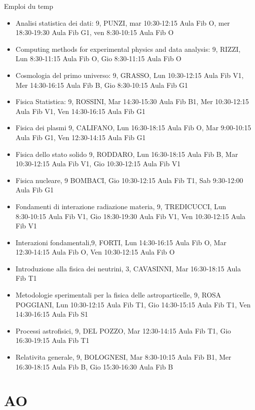 \documentclass[10pt,xcolor={usenames},fleqn,mathserif,serif]{beamer}
\begin{document}
\begin{frame}[allowframebreaks,label={lm2122I}]{Emploi du temp}
\begin{itemize}
\item Analisi statistica dei dati: 9, PUNZI, mar 10:30‑12:15 Aula Fib O, mer 18:30‑19:30 Aula Fib G1, ven 8:30‑10:15 Aula Fib O
\item Computing methods for experimental physics and data analysis: 9, RIZZI, Lun 8:30‑11:15 Aula Fib O, Gio 8:30‑11:15 Aula Fib O
\item Cosmologia del primo universo: 9, GRASSO, Lun 10:30‑12:15 Aula Fib V1, Mer 14:30‑16:15 Aula Fib B, Gio 8:30‑10:15 Aula Fib G1
\item Fisica Statistica: 9, ROSSINI, Mar 14:30‑15:30 Aula Fib B1, Mer 10:30‑12:15 Aula Fib V1, Ven 14:30‑16:15 Aula Fib G1
\item Fisica dei plasmi	9, CALIFANO, Lun 16:30‑18:15 Aula Fib O, Mar 9:00‑10:15 Aula Fib G1, Ven 12:30‑14:15 Aula Fib G1
\item Fisica dello stato solido	9, RODDARO, Lun 16:30‑18:15 Aula Fib B, Mar 10:30‑12:15 Aula Fib V1, Gio 10:30‑12:15 Aula Fib V1
\item Fisica nucleare, 9 BOMBACI, Gio 10:30‑12:15 Aula Fib T1, Sab 9:30‑12:00 Aula Fib G1
\item Fondamenti di interazione radiazione materia, 9, TREDICUCCI, Lun 8:30‑10:15 Aula Fib V1, Gio 18:30‑19:30 Aula Fib V1, Ven 10:30‑12:15 Aula Fib V1
\item Interazioni fondamentali,9, FORTI, Lun 14:30‑16:15 Aula Fib O, Mar 12:30‑14:15 Aula Fib O, Ven 10:30‑12:15 Aula Fib O
\item Introduzione alla fisica dei neutrini, 3, CAVASINNI, Mar 16:30‑18:15 Aula Fib T1
\item Metodologie sperimentali per la fisica delle astroparticelle, 9, ROSA POGGIANI, Lun 10:30‑12:15 Aula Fib T1, Gio 14:30‑15:15 Aula Fib T1, Ven 14:30‑16:15 Aula Fib S1
\item Processi astrofisici, 9, DEL POZZO, Mar 12:30‑14:15 Aula Fib T1, Gio 16:30‑19:15 Aula Fib T1
\item Relativita generale, 9, BOLOGNESI, Mar 8:30‑10:15 Aula Fib B1, Mer 16:30‑18:15 Aula Fib B, Gio 15:30‑16:30 Aula Fib B
\end{itemize}
\end{frame}

\section{AO}
\end{document}
